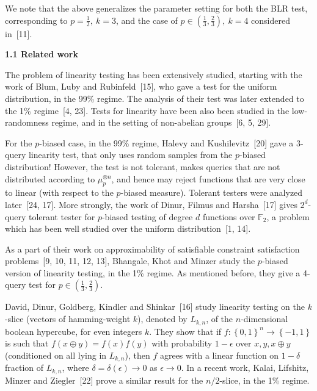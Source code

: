 \documentclass[10pt,a4paper]{article}
\begin{document}



We note that the above generalizes the parameter setting for both the BLR test, corresponding to $p=\frac{1}{2},\ k=3$, and the case of $p\in\left(\frac{1}{3},\frac{2}{3}\right),\ k=4$ considered in [11].\par




\par\medskip\noindent\textbf{
1.1 Related work}\par




The problem of linearity testing has been extensively studied, starting with the work of Blum, Luby and Rubinfeld [15], who gave a test for the uniform distribution, in the 99\% regime.
The analysis of their test was later extended to the 1\% regime [4, 23].
Tests for linearity have been also been studied in the low-randomness regime, and in the setting of non-abelian groups [6, 5, 29].\par




For the $p$-biased case, in the 99\% regime, Halevy and Kushilevitz [20] gave a 3-query linearity test, that only uses random samples from the $p$-biased distribution!
However, the test is not tolerant, makes queries that are not distributed according to $\mu_{p}^{\otimes n}$, and hence may reject functions that are very close to linear (with respect to the $p$-biased measure).
Tolerant testers were analyzed later [24, 17].
More strongly, the work of Dinur, Filmus and Harsha [17] gives $2^{d}$-query tolerant tester for $p$-biased testing of degree $d$ functions over $\mathbb{F}_{2}$, a problem which has been well studied over the uniform distribution [1, 14].\par




As a part of their work on approximability of satisfiable constraint satisfaction problems [9, 10, 11, 12, 13], Bhangale, Khot and Minzer study the $p$-biased version of linearity testing, in the 1\% regime.
As mentioned before, they give a 4-query test for $p\in\left(\frac{1}{3},\frac{2}{3}\right)$.\par




David, Dinur, Goldberg, Kindler and Shinkar [16] study linearity testing on the $k$-slice (vectors of hamming-weight $k$), denoted by $L_{k,n}$, of the $n$-dimensional boolean hypercube, for even integers $k$.
They show that if $f:\left\{0,1\right\}^{n}\to\left\{-1,1\right\}$ is such that $f(x\oplus y)=f(x)f(y)$ with probability $1-\epsilon$ over $x,y,x\oplus y$ (conditioned on all lying in $L_{k,n}$), then $f$ agrees with a linear function on $1-\delta$ fraction of $L_{k,n}$, where $\delta=\delta(\epsilon)\to 0$ as $\epsilon\to 0$.
In a recent work, Kalai, Lifshitz, Minzer and Ziegler [22] prove a similar result for the $n/2$-slice, in the 1\% regime.\par
\end{document}
